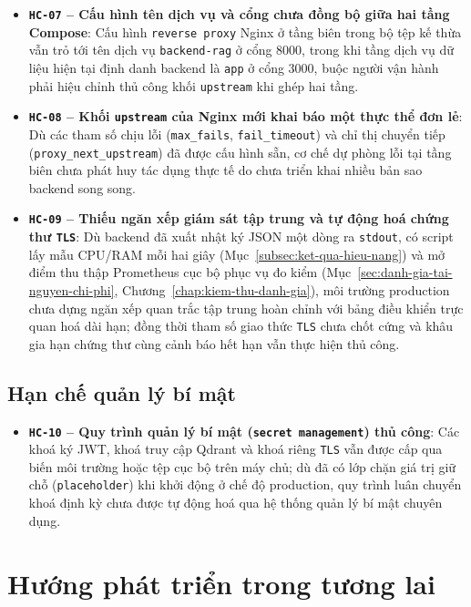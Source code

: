 \begin{itemize}
\item[--] \textbf{\texttt{HC-07} -- Cấu hình tên dịch vụ và cổng chưa đồng bộ giữa hai tầng Compose}: Cấu hình \texttt{reverse proxy} Nginx ở tầng biên trong bộ tệp kế thừa vẫn trỏ tới tên dịch vụ \texttt{backend-rag} ở cổng 8000, trong khi tầng dịch vụ dữ liệu hiện tại định danh backend là \texttt{app} ở cổng 3000, buộc người vận hành phải hiệu chỉnh thủ công khối \texttt{upstream} khi ghép hai tầng.
\item[--] \textbf{\texttt{HC-08} -- Khối \texttt{upstream} của Nginx mới khai báo một thực thể đơn lẻ}: Dù các tham số chịu lỗi (\texttt{max\_fails}, \texttt{fail\_timeout}) và chỉ thị chuyển tiếp (\texttt{proxy\_next\_upstream}) đã được cấu hình sẵn, cơ chế dự phòng lỗi tại tầng biên chưa phát huy tác dụng thực tế do chưa triển khai nhiều bản sao backend song song.
\item[--] \textbf{\texttt{HC-09} -- Thiếu ngăn xếp giám sát tập trung và tự động hoá chứng thư \texttt{TLS}}: Dù backend đã xuất nhật ký JSON một dòng ra \texttt{stdout}, có script lấy mẫu CPU/RAM mỗi hai giây (Mục~\ref{subsec:ket-qua-hieu-nang}) và mở điểm thu thập Prometheus cục bộ phục vụ đo kiểm (Mục~\ref{sec:danh-gia-tai-nguyen-chi-phi}, Chương~\ref{chap:kiem-thu-danh-gia}), môi trường production chưa dựng ngăn xếp quan trắc tập trung hoàn chỉnh với bảng điều khiển trực quan hoá dài hạn; đồng thời tham số giao thức \texttt{TLS} chưa chốt cứng và khâu gia hạn chứng thư cùng cảnh báo hết hạn vẫn thực hiện thủ công.
\end{itemize}

\subsection{Hạn chế quản lý bí mật}
\label{subsec:han-che-quan-ly-bi-mat}

\begin{itemize}
\item[--] \textbf{\texttt{HC-10} -- Quy trình quản lý bí mật (\texttt{secret management}) thủ công}: Các khoá ký JWT, khoá truy cập Qdrant và khoá riêng \texttt{TLS} vẫn được cấp qua biến môi trường hoặc tệp cục bộ trên máy chủ; dù đã có lớp chặn giá trị giữ chỗ (\texttt{placeholder}) khi khởi động ở chế độ production, quy trình luân chuyển khoá định kỳ chưa được tự động hoá qua hệ thống quản lý bí mật chuyên dụng.
\end{itemize}

\section{Hướng phát triển trong tương lai}
\label{sec:huong-phat-trien}

